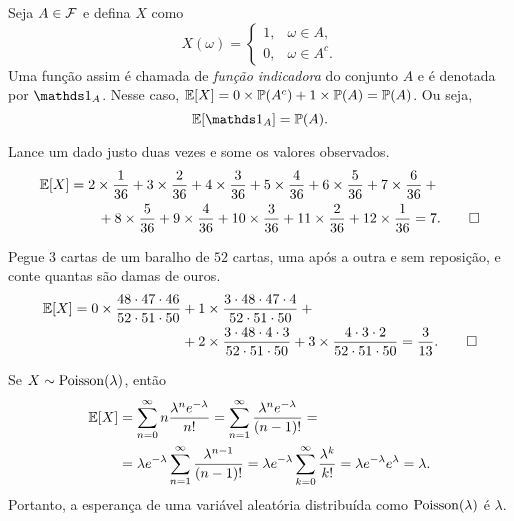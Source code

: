 \begin{example}
Seja $ A \in \mathcal F $ e defina $ X $ como
\[
X(\omega) =
\begin{cases}
1 ,& \omega \in A,
\\
0 ,& \omega \in A^c.
\end{cases}
\]
Uma função assim é chamada de \emph{função indicadora} do conjunto $ A $ e é denotada por $ \I_A $.
Nesse caso,
$\mathbb{E} [X] = 0 \times \mathbb{P}(A^c) + 1 \times \mathbb{P}(A) = \mathbb{P}(A)$.
Ou seja,
\[
\E [\I_A] = \Pb(A).
\]
\end{example}

\begin{example}
\label{example:dadosoma}
Lance um dado justo duas vezes e some os valores observados.
\begin{align}
\mathbb{E} [X] &= 2 \times \frac{1}{36} + 3 \times \frac{2}{36} + 4 \times \frac{3}{36} + 5 \times \frac{4}{36} + 6 \times \frac{5}{36} + 7 \times \frac{6}{36}
+
{}
\\
&
\qquad
+
8 \times \frac{5}{36} + 9 \times \frac{4}{36} + 10 \times \frac{3}{36} + 11 \times \frac{2}{36} + 12 \times \frac{1}{36}
=
7.
\qedhere
\end{align}
\end{example}

\begin{example}
\label{example:trescartas}
Pegue $ 3 $ cartas de um baralho de $ 52 $ cartas, uma após a outra e sem reposição, e conte quantas são damas de ouros.
\begin{align}
\mathbb{E} [X]
=
0 \times \frac{48\cdot47\cdot46}{52\cdot51\cdot50}
&
+ 1 \times \frac{3\cdot48\cdot47\cdot4}{52\cdot51\cdot50} +
{}
\\
&
+
2 \times \frac{3\cdot48\cdot4\cdot3}{52\cdot51\cdot50} + 3 \times \frac{4\cdot3\cdot2}{52\cdot51\cdot50}
=
\frac{3}{13}
.
\qedhere
\end{align}
\end{example}

\begin{example}
[Poisson]
Se $X\sim\mathrm{Poisson}(\lambda)$, então
\begin{align}
\mathbb{E} [X]
&
=
\sum_{n=0}^\infty n \frac{\lambda^n e^{-\lambda}}{n!}
=
\sum_{n=1}^\infty \frac{\lambda^n e^{-\lambda}}{(n-1)!}
=
\\
&=
\lambda e^{-\lambda}
\sum_{n=1}^\infty \frac{\lambda^{n-1}}{(n-1)!}
=
\lambda e^{-\lambda}
\sum_{k=0}^\infty \frac{\lambda^k}{k!}
=
\lambda e^{-\lambda} e^\lambda
=
\lambda.
\end{align}
Portanto, a esperança de uma variável aleatória distribuída como $\mathrm{Poisson}(\lambda)$ é $\lambda$.
\end{example}

